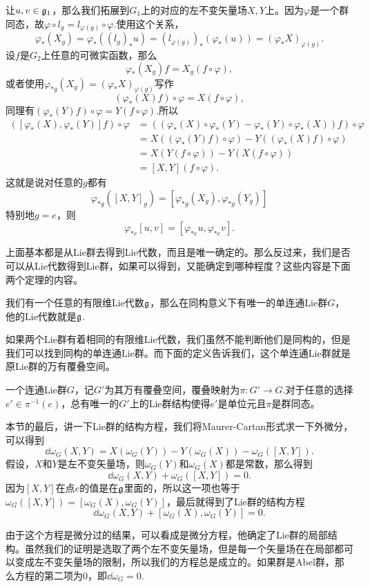 让$u,v\in{\mathfrak{g}}_1$，那么我们拓展到$G_1$上的对应的左不变矢量场$X,Y$上。因为$\varphi$是一个群同态，故$\varphi\circ l_g=l_{\varphi(g)}\circ \varphi$.使用这个关系，
\[
	\varphi_{*}(X_g)=\varphi_{*}((l_g)_*u)=(l_{\varphi(g)})_*(\varphi_{*}(u))=(\varphi_{*}X)_{\varphi(g)}.
\]
设$f$是$G_2$上任意的可微实函数，那么
\[
\varphi_{*}(X_g)f=X_g(f\circ \varphi),
\]
或者使用$\varphi_{*g}(X_g)=(\varphi_{*}X)_{\varphi(g)}$写作
\[
(\varphi_{*}(X)f)\circ \varphi=X(f\circ \varphi),
\]
同理有$(\varphi_{*}(Y)f)\circ \varphi=Y(f\circ \varphi)$.所以
\[
	\begin{split}
		([\varphi_*(X),\varphi_*(Y)]f)\circ \varphi&=((\varphi_*(X)\circ\varphi_*(Y)-\varphi_*(Y)\circ\varphi_*(X))f)\circ \varphi\\
		&=X((\varphi_*(Y)f)\circ \varphi)-Y((\varphi_*(X)f)\circ \varphi)\\
		&=X(Y(f\circ \varphi))-Y(X(f\circ \varphi))\\
		&=[X,Y](f\circ \varphi).
	\end{split}
\]
这就是说对任意的$g$都有
\[
	\varphi_{*g}([X,Y]_g)=[\varphi_{*g}(X_g),\varphi_{*g}(Y_g)]
\]
特别地$g=e$，则
\[
	\varphi_{*e}[u,v]=[\varphi_{*e}u,\varphi_{*e}v].
\]


上面基本都是从Lie群去得到Lie代数，而且是唯一确定的。那么反过来，我们是否可以从Lie代数得到Lie群，如果可以得到，又能确定到哪种程度？这些内容是下面两个定理的内容。
\begin{theo}
我们有一个任意的有限维Lie代数${\mathfrak{g}}$，那么在同构意义下有唯一的单连通Lie群$G$，他的Lie代数就是${\mathfrak{g}}$.
\end{theo}
如果两个Lie群有着相同的有限维Lie代数，我们虽然不能判断他们是同构的，但是我们可以找到同构的单连通Lie群。而下面的定义告诉我们，这个单连通Lie群就是原Lie群的万有覆叠空间。
\begin{theo}
一个连通Lie群$G$，记$G'$为其万有覆叠空间，覆叠映射为$\pi:G'\to G$.对于任意的选择$e'\in \pi^{−1}(e)$，总有唯一的$G'$上的Lie群结构使得$e'$是单位元且$\pi$是群同态。
\end{theo}

本节的最后，讲一下Lie群的结构方程，我们将Maurer-Cartan形式求一下外微分，可以得到
\[
\dd \omega_G(X,Y)=X(\omega_G(Y))-Y(\omega_G(X))-\omega_G([X,Y]).
\]
假设，$X$和$Y$是左不变矢量场，则$\omega_G(Y)$和$\omega_G(X)$都是常数，那么得到
\[
\dd \omega_G(X,Y)+\omega_G([X,Y])=0.
\]
因为$[X,Y]$在点$e$的值是在${\mathfrak{g}}$里面的，所以这一项也等于$\omega_G([X,Y])=[\omega_G(X),\omega_G(Y)]$，最后就得到了Lie群的结构方程
\[
\dd \omega_G(X,Y)+[\omega_G(X),\omega_G(Y)]=0.
\]

由于这个方程是微分过的结果，可以看成是微分方程，他确定了Lie群的局部结构。虽然我们的证明是选取了两个左不变矢量场，但是每一个矢量场在在局部都可以变成左不变矢量场的限制，所以我们的方程总是成立的。如果群是Abel群，那么方程的第二项为0，即$\dd \omega_G=0$.

